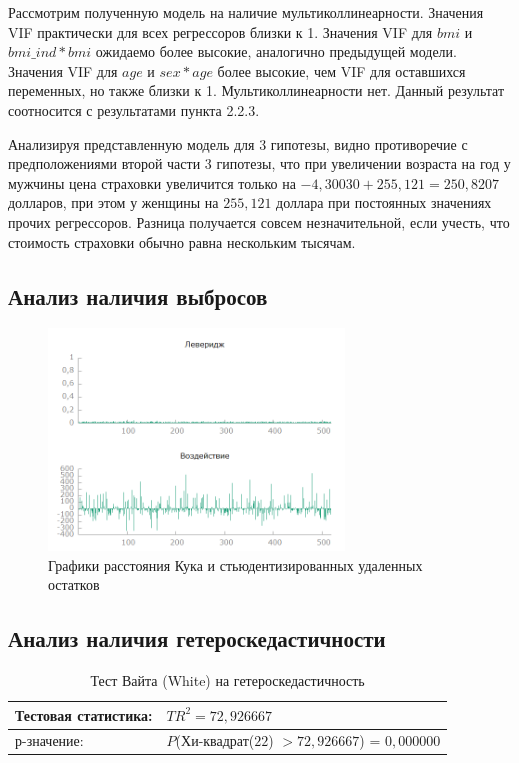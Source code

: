 \documentclass[a4paper,12pt]{article}
\begin{document}
Рассмотрим полученную модель на наличие мультиколлинеарности. Значения VIF практически для всех регрессоров близки к 1. Значения  VIF для $bmi$ и $bmi\_ind * bmi$ ожидаемо более высокие, аналогично предыдущей модели. Значения VIF для $age$ и $sex * age$ более высокие, чем VIF для оставшихся переменных, но также близки к 1. Мультиколлинеарности нет. Данный результат соотносится с результатами пункта 2.2.3.

Анализируя представленную модель для 3 гипотезы, видно противоречие с предположениями второй части 3 гипотезы, что при увеличении возраста на год у мужчины цена страховки увеличится только на $-4,30030 + 255,121 = 250,8207$ долларов, при этом у женщины на $255,121$ доллара при постоянных значениях прочих регрессоров. Разница получается совсем незначительной, если учесть, что стоимость страховки обычно равна нескольким тысячам.

\subsection{Анализ наличия выбросов}
\begin{figure}[H]
	\includegraphics[width=0.7\textwidth]{../[graphics]/lever.png}
	\centering
	\caption{Графики расстояния Кука и стьюдентизированных удаленных остатков}
	\label{fig:lever}
\end{figure}

\subsection{Анализ наличия гетероскедастичности}
\begin{table}[H]
	\begin{center}
		\begin{tabular}{ | l | l |}
			\hline
			Тестовая статистика: & $TR^2 = 72,926667$ \\ \hline
			р-значение: & $P$(Хи-квадрат($22$) $> 72,926667$) = $0,000000$ \\ \hline
		\end{tabular}
	\end{center}
	\caption{Тест Вайта (White) на гетероскедастичность}
	\label{tab:white}
\end{table}
\end{document}
